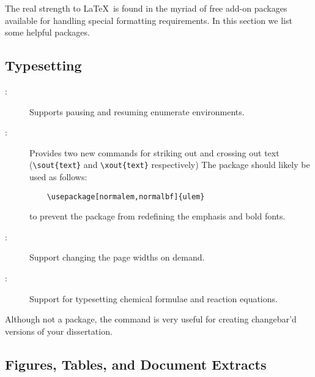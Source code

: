 The real strength to \LaTeX\ is found in the myriad of free add-on
packages available for handling special formatting requirements.
In this section we list some helpful packages.

\subsection{Typesetting}

\begin{description}
\item[:]
    Supports pausing and resuming enumerate environments.

\item[:]
    Provides two new commands for striking out and crossing out text
    (\verb+\sout{text}+ and \verb+\xout{text}+ respectively)
    The package should likely
    be used as follows:
    \begin{verbatim}
    \usepackage[normalem,normalbf]{ulem}
    \end{verbatim}
    to prevent the package from redefining the emphasis and bold fonts.

\item[:]
    Support changing the page widths on demand.

\item[:] 
    Support for typesetting chemical formulae and reaction equations.

\end{description}

Although not a package, the
command is very useful for creating changebar'd versions of your
dissertation.


\subsection{Figures, Tables, and Document Extracts}

